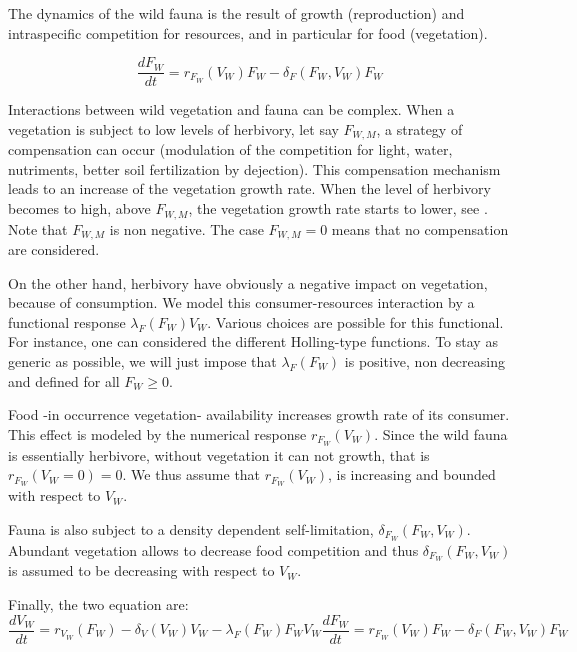 \documentclass{article}
\newcommand{\lfw}{\lambda_{F}}
\begin{document}
\bigskip

The dynamics of the wild fauna is the result of growth (reproduction) and intraspecific competition for resources, and in particular for food (vegetation). 

\begin{equation*}
\dfrac{dF_W}{dt} = r_{F_W}(V_W) F_W - \delta_F(F_W, V_W) F_W
\end{equation*}

Interactions between wild vegetation and fauna can be complex. When a vegetation is subject to low levels of herbivory, let say $F_{W,M}$, a strategy of compensation can 
occur (modulation of the competition for light, water, nutriments, better soil fertilization by dejection). This compensation mechanism leads to an increase of the vegetation growth rate. When the level of herbivory becomes to high, above $F_{W,M}$, the vegetation growth rate starts to lower, see \cite{lebon_direct_2014}. Note that $F_{W,M}$ is non negative. The case $F_{W,M} = 0$ means that no compensation are considered.

On the other hand, herbivory have obviously a negative impact on vegetation, because of consumption. We model this consumer-resources interaction by a functional response $\lfw(F_W)V_W$. Various choices are possible for this functional. For instance, one can considered the different Holling-type functions. To stay as generic as possible, we will just impose that $\lfw(F_W)$ is positive, non decreasing and defined for all $F_W \geq 0$.

Food -in occurrence vegetation- availability increases growth rate of its consumer. This effect is modeled by the numerical response $r_{F_W}(V_W)$. Since the wild fauna is essentially herbivore, without vegetation it can not growth, that is $r_{F_W}(V_W = 0) = 0$. We thus assume that $r_{F_W}(V_W)$, is increasing and bounded with respect to $V_W$.

Fauna is also subject to a density dependent self-limitation, $\delta_{F_W}(F_W, V_W)$. Abundant vegetation allows to decrease food competition and thus $\delta_{F_W}(F_W, V_W)$ is assumed to be decreasing with respect to $V_W$.

Finally, the two equation are:
\begin{subequations}
\begin{equation*}
\dfrac{dV_W}{dt} = r_{V_W}(F_W) - \delta_V(V_W) V_W - \lfw(F_W) F_W V_W
\end{equation*}
\begin{equation*}
\dfrac{dF_W}{dt} = r_{F_W}(V_W) F_W - \delta_F(F_W, V_W) F_W
\end{equation*}
\end{subequations}
\end{document}
